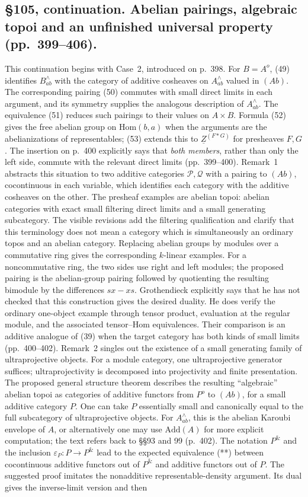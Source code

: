 \documentclass[10pt,oneside]{book}
\begin{document}
\subsection*{\S105, continuation. Abelian pairings, algebraic topoi and an unfinished universal property (pp.\ 399--406).}
This continuation begins with Case~2, introduced on p.\ 398. For $B=A^o$, (49) identifies $B^\wedge_{ab}$ with the category of additive cosheaves on $A^\wedge_{ab}$ valued in $(Ab)$. The corresponding pairing (50) commutes with small direct limits in each argument, and its symmetry supplies the analogous description of $A^\wedge_{ab}$. The equivalence (51) reduces such pairings to their values on $A\times B$. Formula (52) gives the free abelian group on $\mathrm{Hom}(b,a)$ when the arguments are the abelianizations of representables; (53) extends this to $\underline Z^{(F*G)}$ for presheaves $F,G$. The insertion on p.\ 400 explicitly says that \emph{both members}, rather than only the left side, commute with the relevant direct limits (pp.\ 399--400). Remark~1 abstracts this situation to two additive categories $\mathcal P,\mathcal Q$ with a pairing to $(Ab)$, cocontinuous in each variable, which identifies each category with the additive cosheaves on the other. The presheaf examples are abelian topoi: abelian categories with exact small filtering direct limits and a small generating subcategory. The visible revisions add the filtering qualification and clarify that this terminology does not mean a category which is simultaneously an ordinary topos and an abelian category. Replacing abelian groups by modules over a commutative ring gives the corresponding $k$-linear examples. For a noncommutative ring, the two sides use right and left modules; the proposed pairing is the abelian-group pairing followed by quotienting the resulting bimodule by the differences $sx-xs$. Grothendieck explicitly says that he has not checked that this construction gives the desired duality. He does verify the ordinary one-object example through tensor product, evaluation at the regular module, and the associated tensor--Hom equivalences. Their comparison is an additive analogue of (39) when the target category has both kinds of small limits (pp.\ 400--402). Remark~2 singles out the existence of a small generating family of ultraprojective objects. For a module category, one ultraprojective generator suffices; ultraprojectivity is decomposed into projectivity and finite presentation. The proposed general structure theorem describes the resulting “algebraic” abelian topoi as categories of additive functors from $P^o$ to $(Ab)$, for a small additive category $P$. One can take $P$ essentially small and canonically equal to the full subcategory of ultraprojective objects. For $A^\wedge_{ab}$, this is the abelian Karoubi envelope of $A$, or alternatively one may use $\mathrm{Add}(A)$ for more explicit computation; the text refers back to \S\S93 and 99 (p.\ 402). The notation $P^{\&}$ and the inclusion $\varepsilon_P:P\to P^{\&}$ lead to the expected equivalence (**) between cocontinuous additive functors out of $P^{\&}$ and additive functors out of $P$. The suggested proof imitates the nonadditive representable-density argument. Its dual gives the inverse-limit version and then 
\end{document}
